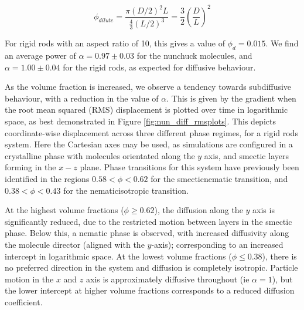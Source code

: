 \documentclass[11pt, a4paper]{article} %
\begin{document}
\begin{equation}
\phi_{dilute} = \frac{\pi(D/2)^{2}L}{\frac{4}{3}(L/2)^{3}} = \frac{3}{2} \left( \frac{D}{L}\right)^{2} 
\end{equation}

For rigid rods with an aspect ratio of 10, this gives a value of $\phi_{d} = 0.015$. We find an average power of $ \alpha = 0.97 \pm 0.03 $ for the nunchuck molecules, and $ \alpha = 1.00 \pm 0.04 $ for the rigid rods, as expected for diffusive behaviour. 

As the volume fraction is increased, we observe a tendency towards subdiffusive behaviour, with a reduction in the value of $\alpha$. This is given by the gradient when the root mean squared (RMS) displacement is plotted over time in logarithmic space, as best demonstrated in Figure \ref{fig:nun_diff_rmsplots}. This depicts coordinate-wise displacement across three different phase regimes, for a rigid rods system. Here the Cartesian axes may be used, as simulations are configured in a crystalline phase with molecules orientated along the $y$ axis, and smectic layers forming in the $x-z$ plane. Phase transitions for this system have previously been identified in the regions $0.58<\phi<0.62$ for the smectic\textendash nematic transition, and $0.38<\phi<0.43$ for the nematic\textendash isotropic transition. 

At the highest volume fractions ($\phi \geq 0.62$), the diffusion along the $y$ axis is significantly reduced, due to the restricted motion between layers in the smectic phase. Below this, a nematic phase is observed, with increased diffusivity along the molecule director (aligned with the $y$-axis); corresponding to an increased intercept in logarithmic space. At the lowest volume fractions ($\phi \leq 0.38$), there is no preferred direction in the system and diffusion is completely isotropic. Particle motion in the $x$ and $z$ axis is approximately diffusive throughout (ie $\alpha = 1$), but the lower intercept at higher volume fractions corresponds to a reduced diffusion coefficient. 
\end{document}
